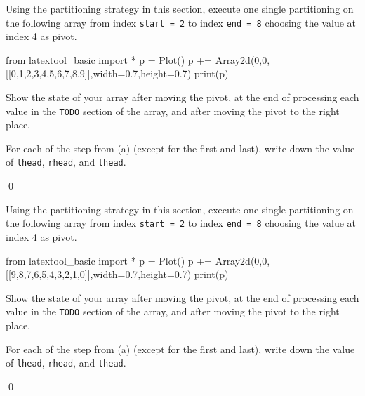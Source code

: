 \newpage
\begin{ex}
\begin{tightlist}
\item Using the partitioning strategy in this section,
execute one single partitioning on the following array
from index \verb!start = 2! to index \verb!end = 8!
choosing the value at index 4 as pivot.

\begin{python}
from latextool_basic import *
p = Plot()
p += Array2d(0,0,[[0,1,2,3,4,5,6,7,8,9]],width=0.7,height=0.7)
print(p)
\end{python}

Show the state of your array after moving the pivot, at the end of
processing each value in the \verb!TODO! section of the array,
and after moving the pivot to the right place.
\item For each of the step from (a) (except for the first and last),
write down the value of \verb!lhead!, \verb!rhead!, and \verb!thead!.
\end{tightlist}
\qed
\end{ex}


\newpage
\begin{ex}
\begin{tightlist}
\item Using the partitioning strategy in this section,
execute one single partitioning on the following array
from index \verb!start = 2! to index \verb!end = 8!
choosing the value at index 4 as pivot.

\begin{python}
from latextool_basic import *
p = Plot()
p += Array2d(0,0,[[9,8,7,6,5,4,3,2,1,0]],width=0.7,height=0.7)
print(p)
\end{python}

Show the state of your array after moving the pivot, at the end of
processing each value in the \verb!TODO! section of the array,
and after moving the pivot to the right place.
\item For each of the step from (a) (except for the first and last),
write down the value of \verb!lhead!, \verb!rhead!, and \verb!thead!.
\end{tightlist}
\qed
\end{ex}

